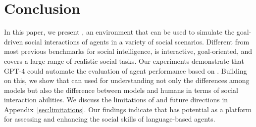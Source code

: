 \vspace{-5pt}
\section{Conclusion}
\vspace{-5pt}
In this paper, we present \sotopia, an environment that can be used to simulate the goal-driven social interactions of agents in a variety of social scenarios. 
Different from most previous benchmarks for social intelligence, \sotopia is interactive, goal-oriented, and covers a large range of realistic social tasks.
Our experiments demonstrate that GPT-4 could automate the evaluation of agent performance based on \sotopiaeval.
Building on this, we show that \sotopia can used for understanding not only the differences among models but also the difference between models and humans in terms of social interaction abilities. 
We discuss the limitations of \sotopia and future directions in Appendix~\ref{sec:limitations}. Our findings indicate that \sotopia has potential as a platform for assessing and enhancing the social skills of language-based agents.
